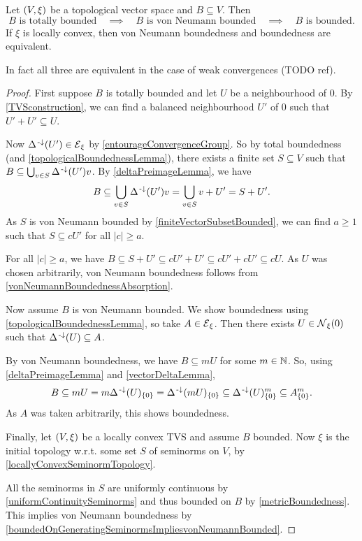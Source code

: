 \begin{proposition} \label{boundednessTVS}
Let $\left( V,\xi \right)$ be a topological vector space and $B\subseteq V$. Then
\[ \text{$B$ is totally bounded}\quad\implies\quad\text{$B$ is von Neumann bounded}\quad\implies\quad\text{$B$ is bounded}. \]
If $\xi$ is locally convex, then von Neumann boundedness and boundedness are equivalent.
\end{proposition}
In fact all three are equivalent in the case of weak convergences (TODO ref).
\begin{proof}
First suppose $B$ is totally bounded and let $U$ be a neighbourhood of $0$. By \ref{TVSconstruction}, we can find a balanced neighbourhood $U'$ of $0$ such that $U'+U'\subseteq U$.

Now $\Delta^{\text{\hspace{0.15em}-}\downarrow}(U')\in \operatorname{\mathcal{E}}_\xi$ by \ref{entourageConvergenceGroup}. So by total boundedness (and \ref{topologicalBoundednessLemma}), there exists a finite set $S\subseteq V$ such that $B\subseteq \bigcup_{v\in S}\Delta^{\text{\hspace{0.15em}-}\downarrow}(U')v$. By \ref{deltaPreimageLemma}, we have
\[ B\subseteq \bigcup_{v\in S}\Delta^{\text{\hspace{0.15em}-}\downarrow}(U')v = \bigcup_{v\in S} v+U' = S+U'. \]
As $S$ is von Neumann bounded by \ref{finiteVectorSubsetBounded}, we can find $a\geq 1$ such that $S\subseteq cU'$ for all $|c|\geq a$.

For all $|c|\geq a$, we have $B\subseteq S+U' \subseteq cU' + U' \subseteq cU'+cU' \subseteq cU$. As $U$ was chosen arbitrarily, von Neumann boundedness follows from \ref{vonNeumannBoundednessAbsorption}.

Now assume $B$ is von Neumann bounded. We show boundedness using \ref{topologicalBoundednessLemma}, so take $A\in \operatorname{\mathcal{E}}_\xi$. Then there exists $U\in \operatorname{\mathcal{N}}_\xi(0)$ such that $\Delta^{\text{\hspace{0.15em}-}\downarrow}(U)\subseteq A$.

By von Neumann boundedness, we have $B\subseteq mU$ for some $m\in\mathbb{N}$. So, using \ref{deltaPreimageLemma} and \ref{vectorDeltaLemma},
\[ B\subseteq mU = m\Delta^{\text{\hspace{0.15em}-}\downarrow}(U)_{\{0\}} = \Delta^{\text{\hspace{0.15em}-}\downarrow}(mU)_{\{0\}} \subseteq \Delta^{\text{\hspace{0.15em}-}\downarrow}(U)^m_{\{0\}} \subseteq A^m_{\{0\}}. \]
As $A$ was taken arbitrarily, this shows boundedness.

Finally, let $\left( V,\xi \right)$ be a locally convex TVS and assume $B$ bounded. Now $\xi$ is the initial topology w.r.t. some set $S$ of seminorms on $V$, by \ref{locallyConvexSeminormTopology}.

All the seminorms in $S$ are uniformly continuous by \ref{uniformContinuitySeminorms} and thus bounded on $B$ by \ref{metricBoundedness}. This implies von Neumann boundedness by \ref{boundedOnGeneratingSeminormsImpliesvonNeumannBounded}.
\end{proof}


